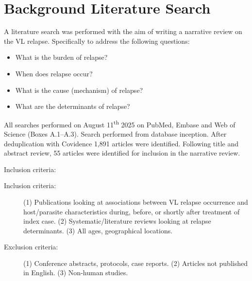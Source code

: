 

\chapter{\label{app:background}Background Literature Search}
\minitoc

A literature search was performed with the aim of writing a narrative review on the VL relapse. Specifically to address the following questions:

\begin{itemize}[noitemsep]
  \item What is the burden of relapse?
  \item When does relapse occur?
  \item What is the cause (mechanism) of relapse?
  \item What are the determinants of relapse?
\end{itemize}

All searches performed on August 11\textsuperscript{th} 2025 on PubMed, Embase and Web of Science (Boxes A.1--A.3). Search performed from database inception. After deduplication with Covidence\cite{covidence} 1,891 articles were identified. Following title and abstract review, 55 articles were identified for inclusion in the narrative review.

Inclusion criteria:
\begin{description}
  \item[Inclusion criteria:](1) Publications looking at associations between VL relapse occurrence and host/parasite characteristics during, before, or shortly after treatment of index case. (2) Systematic/literature reviews looking at relapse determinants. (3) All ages, geographical locations.
  \item[Exclusion criteria:](1) Conference abstracts, protocols, case reports. (2) Articles not published in English. (3) Non-human studies.
\end{description}

